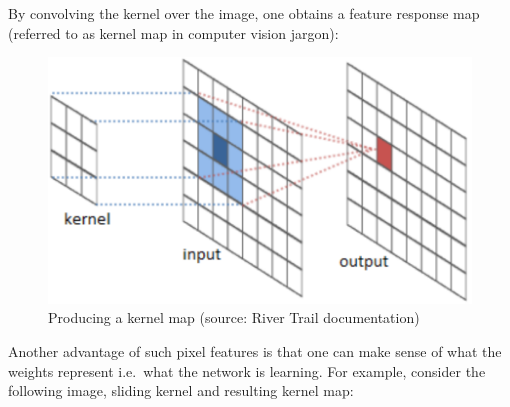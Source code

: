 \documentclass[a4paper,11pt]{article}
\begin{document}
By convolving the kernel over the image, one obtains a feature response map (referred to as kernel map in computer vision jargon):

\begin{figure}[h!]
	\centering
	\includegraphics[scale=0.3]{images/kernel_map.png}
	\caption{Producing a kernel map (source: River Trail documentation)}
    \label{f20}
\end{figure}

Another advantage of such pixel features is that one can make sense of what the weights represent i.e.\ what the network is learning. For example, consider the following image, sliding kernel and resulting kernel map:
\end{document}
